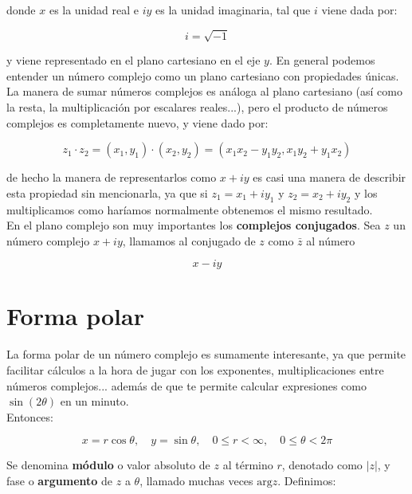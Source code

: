 \documentclass[12pt,a4paper]{book}
\newcommand{\Arg}{\mathrm{arg}}
\begin{document}
donde $x$ es la unidad real e  $i y$ es la unidad imaginaria, tal que $i$ viene dada por:

\begin{equation}
i = \sqrt{-1}
\end{equation}

y viene representado en el plano cartesiano en el eje $y$. En general podemos entender un número complejo como un plano cartesiano con propiedades únicas. La manera de sumar números complejos es análoga al plano cartesiano (así como la resta, la multiplicación por escalares reales...), pero el producto de números complejos es completamente nuevo, y viene dado por:

\begin{equation}
z_1 \cdot z_2 = (x_1,y_1) \cdot (x_2,y_2) = (x_1 x_2 - y_1 y_2, x_1 y_2 + y_1 x_2)
\end{equation}

de hecho la manera de representarlos como $x+iy$ es casi una manera de describir esta propiedad sin mencionarla, ya que si $z_1 = x_1+ i y_1$ y $z_2 = x_2 + i y_2$ y los multiplicamos como haríamos normalmente obtenemos el mismo resultado. \\

En el plano complejo son muy importantes los \textbf{complejos conjugados}. Sea $z$ un número complejo $x+iy$, llamamos al conjugado de $z$ como $\bar{z}$ al número

$$ x -iy $$

\section{Forma polar}

La forma polar de un número complejo es sumamente interesante, ya que permite facilitar cálculos a la hora de jugar con los exponentes, multiplicaciones entre números complejos... además de que te permite calcular expresiones como $\sin (2 \theta)$ en un minuto. \\

Entonces: 

\begin{equation}
x = r \cos \theta, \quad y = \sin \theta, \quad 0 \leq r < \infty, \quad 0 \leq \theta < 2 \pi
\end{equation}

Se denomina \textbf{módulo} o valor absoluto de $z$ al término $r$, denotado como $|z|$, y fase o \textbf{argumento} de $z$ a $\theta$, llamado muchas veces $\Arg{z}$. Definimos:
\end{document}
